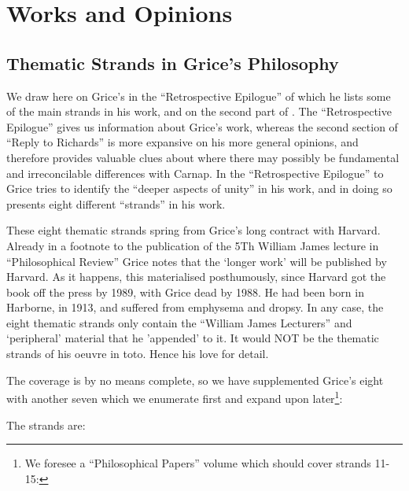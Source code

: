 \documentclass[10pt,titlepage]{book}
\begin{document}
\section{Works and Opinions}

\subsection{Thematic Strands in Grice's Philosophy}

We draw here on Grice's \cite{grice89} in the ``Retrospective Epilogue'' of which he lists some of the main strands in his work, and on the second part of \cite{grice86b}.
The ``Retrospective Epilogue'' gives us information about Grice's work, whereas the second section of ``Reply to Richards'' is more expansive on his more general opinions, and therefore provides valuable clues about where there may possibly be fundamental and irreconcilable differences with Carnap.
In the ``Retrospective Epilogue'' to \cite{grice88} Grice tries to identify the ``deeper aspects of unity'' in his work, and in doing so presents eight different ``strands'' in his work.

These eight thematic strands spring from Grice's long contract with Harvard.
Already in a footnote to the publication of the 5Th William James lecture in ``Philosophical Review'' Grice notes that the `longer work' will be published by Harvard.
As it happens, this materialised posthumously, since Harvard got the book off the press by 1989, with Grice dead by 1988.
He had been born in Harborne, in 1913, and suffered from emphysema and dropsy.
In any case, the eight thematic strands only contain the ``William James Lecturers'' and `peripheral' material that he 'appended' to it.
It would NOT be the thematic strands of his oeuvre in toto.
Hence his love for detail.

The coverage is by no means complete, so we have supplemented Grice's eight with another seven which we enumerate first and expand upon later\footnote{
We foresee a ``Philosophical Papers'' volume which should cover strands 11-15:
}:

The strands are:
\end{document}
